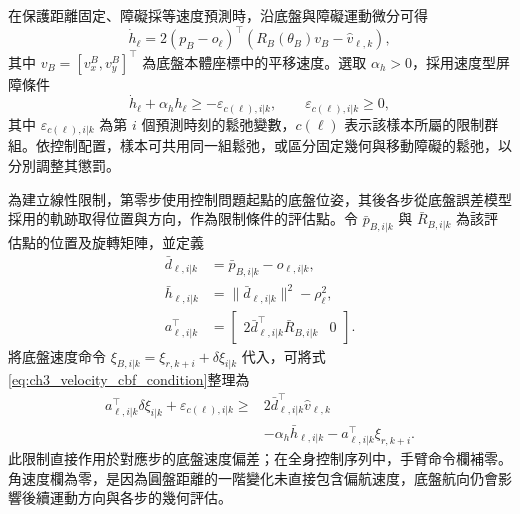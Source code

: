 在保護距離固定、障礙採等速度預測時，沿底盤與障礙運動微分可得
\begin{equation}
    \dot{h}_{\ell}
    =2(p_B-o_{\ell})^{\top}
      \left(R_B(\theta_B)v_B-\hat{v}_{\ell,k}\right),
    \label{eq:ch3_obstacle_barrier_derivative}
\end{equation}
其中 $v_B=[v_x^B,v_y^B]^{\top}$ 為底盤本體座標中的平移速度。選取 $\alpha_h>0$，採用速度型屏障條件
\begin{equation}
    \dot{h}_{\ell}+\alpha_h h_{\ell}
    \geq-\varepsilon_{c(\ell),i|k},
    \qquad \varepsilon_{c(\ell),i|k}\geq0,
    \label{eq:ch3_velocity_cbf_condition}
\end{equation}
其中 $\varepsilon_{c(\ell),i|k}$ 為第 $i$ 個預測時刻的鬆弛變數，$c(\ell)$ 表示該樣本所屬的限制群組。依控制配置，樣本可共用同一組鬆弛，或區分固定幾何與移動障礙的鬆弛，以分別調整其懲罰。

為建立線性限制，第零步使用控制問題起點的底盤位姿，其後各步從底盤誤差模型採用的軌跡取得位置與方向，作為限制條件的評估點。令 $\bar{p}_{B,i|k}$ 與 $\bar{R}_{B,i|k}$ 為該評估點的位置及旋轉矩陣，並定義
\begin{equation}
    \begin{aligned}
        \bar{d}_{\ell,i|k}
        &=\bar{p}_{B,i|k}-o_{\ell,i|k}, \\
        \bar{h}_{\ell,i|k}
        &=\|\bar{d}_{\ell,i|k}\|^2-\rho_{\ell}^{2}, \\
        a_{\ell,i|k}^{\top}
        &=\begin{bmatrix}
            2\bar{d}_{\ell,i|k}^{\top}\bar{R}_{B,i|k} & 0
          \end{bmatrix}.
    \end{aligned}
    \label{eq:ch3_cbf_nominal_geometry}
\end{equation}
將底盤速度命令 $\xi_{B,i|k}=\xi_{r,k+i}+\delta\xi_{i|k}$ 代入，可將式\eqref{eq:ch3_velocity_cbf_condition}整理為
\begin{equation}
    \begin{aligned}
        a_{\ell,i|k}^{\top}\delta\xi_{i|k}
        +\varepsilon_{c(\ell),i|k}
        \geq{}&2\bar{d}_{\ell,i|k}^{\top}\hat{v}_{\ell,k} \\
               &-\alpha_h\bar{h}_{\ell,i|k}
                -a_{\ell,i|k}^{\top}\xi_{r,k+i}.
    \end{aligned}
    \label{eq:ch3_cbf_affine_constraint}
\end{equation}
此限制直接作用於對應步的底盤速度偏差；在全身控制序列中，手臂命令欄補零。角速度欄為零，是因為圓盤距離的一階變化未直接包含偏航速度，底盤航向仍會影響後續運動方向與各步的幾何評估。

